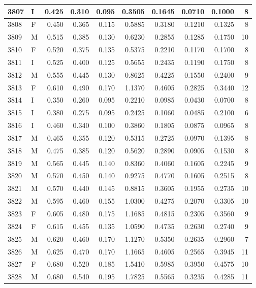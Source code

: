 \documentclass[9pt,twocolumn,twoside,]{pnas-new}
\begin{document}
\begin{tabular}{l|l|r|r|r|r|r|r|r|r}
\hline
3807 & I & 0.425 & 0.310 & 0.095 & 0.3505 & 0.1645 & 0.0710 & 0.1000 & 8\\
\hline
3808 & F & 0.450 & 0.365 & 0.115 & 0.5885 & 0.3180 & 0.1210 & 0.1325 & 8\\
\hline
3809 & M & 0.515 & 0.385 & 0.130 & 0.6230 & 0.2855 & 0.1285 & 0.1750 & 10\\
\hline
3810 & F & 0.520 & 0.375 & 0.135 & 0.5375 & 0.2210 & 0.1170 & 0.1700 & 8\\
\hline
3811 & I & 0.525 & 0.400 & 0.125 & 0.5655 & 0.2435 & 0.1190 & 0.1750 & 8\\
\hline
3812 & M & 0.555 & 0.445 & 0.130 & 0.8625 & 0.4225 & 0.1550 & 0.2400 & 9\\
\hline
3813 & F & 0.610 & 0.490 & 0.170 & 1.1370 & 0.4605 & 0.2825 & 0.3440 & 12\\
\hline
3814 & I & 0.350 & 0.260 & 0.095 & 0.2210 & 0.0985 & 0.0430 & 0.0700 & 8\\
\hline
3815 & I & 0.380 & 0.275 & 0.095 & 0.2425 & 0.1060 & 0.0485 & 0.2100 & 6\\
\hline
3816 & I & 0.460 & 0.340 & 0.100 & 0.3860 & 0.1805 & 0.0875 & 0.0965 & 8\\
\hline
3817 & M & 0.465 & 0.355 & 0.120 & 0.5315 & 0.2725 & 0.0970 & 0.1395 & 8\\
\hline
3818 & M & 0.475 & 0.385 & 0.120 & 0.5620 & 0.2890 & 0.0905 & 0.1530 & 8\\
\hline
3819 & M & 0.565 & 0.445 & 0.140 & 0.8360 & 0.4060 & 0.1605 & 0.2245 & 9\\
\hline
3820 & M & 0.570 & 0.450 & 0.140 & 0.9275 & 0.4770 & 0.1605 & 0.2515 & 8\\
\hline
3821 & M & 0.570 & 0.440 & 0.145 & 0.8815 & 0.3605 & 0.1955 & 0.2735 & 10\\
\hline
3822 & M & 0.595 & 0.460 & 0.155 & 1.0300 & 0.4275 & 0.2070 & 0.3305 & 10\\
\hline
3823 & F & 0.605 & 0.480 & 0.175 & 1.1685 & 0.4815 & 0.2305 & 0.3560 & 9\\
\hline
3824 & F & 0.615 & 0.455 & 0.135 & 1.0590 & 0.4735 & 0.2630 & 0.2740 & 9\\
\hline
3825 & M & 0.620 & 0.460 & 0.170 & 1.1270 & 0.5350 & 0.2635 & 0.2960 & 7\\
\hline
3826 & M & 0.625 & 0.470 & 0.170 & 1.1665 & 0.4605 & 0.2565 & 0.3945 & 11\\
\hline
3827 & F & 0.680 & 0.520 & 0.185 & 1.5410 & 0.5985 & 0.3950 & 0.4575 & 10\\
\hline
3828 & M & 0.680 & 0.540 & 0.195 & 1.7825 & 0.5565 & 0.3235 & 0.4285 & 11\\

\end{tabular}
\end{document}

